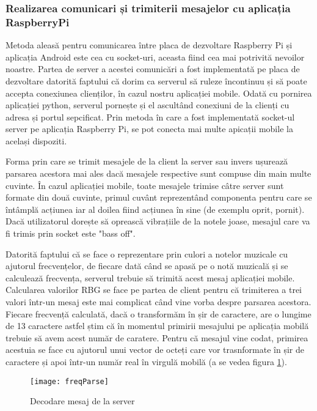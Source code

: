 \documentclass[../IoMusT.tex]{subfiles}
\begin{document}
\subsubsection{Realizarea comunicari și trimiterii mesajelor cu aplicația RaspberryPi}
Metoda aleasă pentru comunicarea între placa de dezvoltare Raspberry Pi și aplicația Android este cea cu socket-uri, aceasta fiind cea mai potrivită nevoilor noastre. Partea de server a acestei comunicări a fost implementată pe placa de dezvoltare datorită faptului că dorim ca serverul să ruleze încontinuu și să poate accepta conexiunea clienților, în cazul nostru aplicației mobile. Odată cu pornirea aplicației python, serverul pornește și el ascultând conexiuni de la clienți cu adresa și portul sepcificat. Prin metoda în care a fost implementată socket-ul server pe aplicația Raspberry Pi, se pot conecta mai multe apicații mobile la același dispoziti.
\\
\par Forma prin care se trimit mesajele de la client la server sau invers ușurează parsarea acestora mai ales dacă mesajele respective sunt compuse din main multe cuvinte. În cazul aplicației mobile, toate mesajele trimise câtre server sunt formate din două cuvinte, primul cuvânt reprezentând componenta pentru care se întâmplă acțiunea iar al doilea fiind acțiunea în sine (de exemplu oprit, pornit). Dacă utilizatorul dorește să oprească vibrațiile de la notele joase, mesajul care va fi trimis prin socket este "bass off". 
\\
\par Datorită faptului că se face o reprezentare prin culori a notelor muzicale cu ajutorul frecvențelor, de fiecare dată când se apasă pe o notă muzicală și se calculează frecvența, serverul trebuie să trimită acest mesaj aplicației mobile. Calcularea valorilor RBG se face pe partea de client pentru că trimiterea a trei valori într-un mesaj este mai complicat când vine vorba despre parsarea acestora. Fiecare frecvență calculată, dacă o transformăm în șir de caractere, are o lungime de 13 caractere astfel știm că în momentul primirii mesajului pe aplicația mobilă trebuie să avem acest număr de caratere. Pentru că mesajul vine codat, primirea acestuia se face cu ajutorul unui vector de octeți care vor trasnformate în șir de caractere și apoi într-un număr real în virgulă mobilă (a se vedea figura \ref{fig:freqParse}).
\begin{figure}[h]
\centering
\texttt{[image: freqParse]}
\caption{Decodare mesaj de la server}
\label{fig:freqParse}
\end{figure} 
\end{document}

